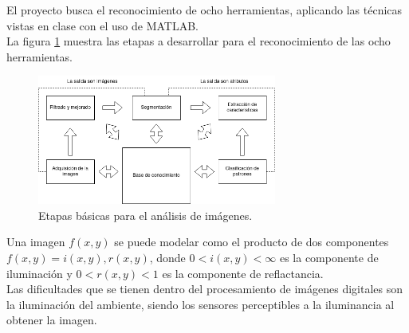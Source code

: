 \documentclass[a4paper, 11pt]{article}
\begin{document}
El proyecto busca el reconocimiento de ocho herramientas, aplicando las técnicas vistas en clase con el uso de MATLAB.\\

La figura \ref{etapas_basicas} muestra las etapas a desarrollar para el reconocimiento de las ocho herramientas.\\

\begin{figure}[h]
\centering
\includegraphics[width=0.7\textwidth]{etapas_basicas}
\caption{Etapas básicas para el análisis de imágenes.}
\label{etapas_basicas}
\end{figure}

Una imagen $f(x,y)$ se puede modelar como el producto de dos componentes $f(x,y) = i(x,y),r(x,y)$, donde $0<i(x,y)<\infty$ es la componente de iluminación y $0<r(x,y)<1$ es la componente de reflactancia.\\

Las dificultades que se tienen dentro del procesamiento de imágenes digitales son la iluminación del ambiente, siendo los sensores perceptibles a la iluminancia al obtener la imagen.\\




\end{document}
